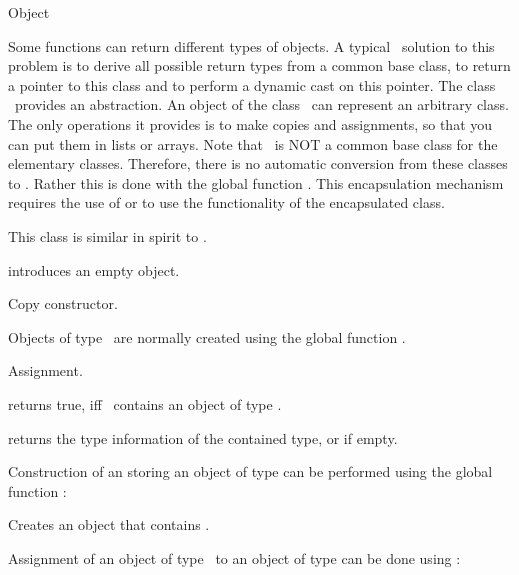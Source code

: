 \begin{ccRefClass}{Object}


\ccDefinition  
Some functions can return different types of objects. A typical
\CC\ solution to this problem is to derive all possible return
types from a common base class, to return a pointer to this 
class and to perform a dynamic cast on this pointer. The class
\ccRefName\ provides an abstraction.
An object  of the class \ccRefName\ can
represent an arbitrary class. The only operations it provides is
to make copies and assignments, so that you can put them in lists
or arrays. Note that \ccRefName\ is NOT a common base class for the
elementary classes. Therefore, there is no 
automatic conversion from these classes to \ccRefName. Rather 
this is done with the global function . This 
encapsulation mechanism requires the use of  or
 to use the functionality of the encapsulated class.

This class is similar in spirit to .

\ccCreation
{}

            {introduces an empty object.}

            {Copy constructor.}

Objects of type \ccRefName\ are normally created using the global function
.

\ccOperations

            {Assignment.}


{returns true, iff \ccVar\ contains an object of type .}

         {returns the type information of the contained type,
          or  if empty.}

Construction of an  storing an object of type 
can be performed using the  global function :

{Creates an object that contains .}


Assignment of an object of type \ccRefName\ to an object of type  
can be done using  :


\end{ccRefClass}
